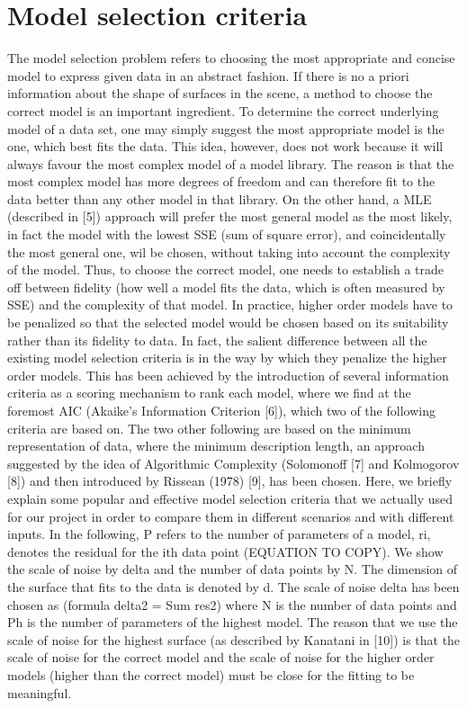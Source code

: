 \documentclass[12pt]{article}
\begin{document}
\section{Model selection criteria}
\label{sec:crit}
The model selection problem refers to choosing the most appropriate and concise model to express given data in an abstract fashion.
If there is no a priori information about the shape of surfaces in the scene, a method to choose the correct model is an important ingredient.   
To determine the correct underlying model of a data set, one may simply suggest the most appropriate model is the one, which best fits the data. This idea, however, does not work because it will always favour the most complex model of a model library. The reason is that the most complex model has more degrees of freedom and can therefore fit to the data better than any other model in that library.
On the other hand, a MLE (described in [5]) approach will prefer the most general model as the most likely, in fact the model with the lowest SSE (sum of square error), and coincidentally the most general one, wil be chosen, without taking into account the complexity of the model. 
Thus, to choose the correct model, one needs to establish a trade off between fidelity (how well a model fits the data, which is often measured by SSE) and the complexity of that model. In practice, higher order models have to be penalized so that the selected model would be chosen based on its suitability rather than its fidelity to data. In fact, the salient difference between all the existing model selection criteria is in the way by which they penalize the higher order models.
This has been achieved by the introduction of several information criteria as a scoring mechanism to rank each model, where we find at the foremost AIC (Akaike's Information Criterion [6]), which two of the following criteria are based on. The two other following are based on the minimum representation of data, where  the minimum description length, an approach suggested by the idea of Algorithmic Complexity (Solomonoff [7] and Kolmogorov [8]) and then introduced by Rissean (1978) [9], has been chosen.
Here, we briefly explain some popular and effective model selection criteria that we actually used for our project in order to compare them in different scenarios and with different inputs.
In the following, P refers to the number of parameters of a model, ri, denotes the residual for the ith data point (EQUATION TO COPY).
We show the scale of noise by delta and the number of data points by N. The dimension of the surface that fits to the data is denoted by d.
The scale of noise delta has been chosen as (formula delta2 = Sum res2) where N is the number of data points and Ph is the number of parameters of the highest model. The reason that we use the scale of noise for the highest surface (as described by Kanatani in [10]) is that the scale of noise for the correct model and the scale of noise for the higher order models (higher than the correct model) must be close for the fitting to be meaningful.
\end{document}
